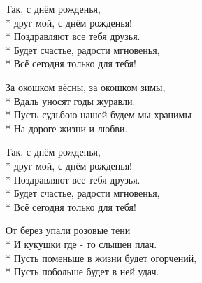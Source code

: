 \medskip

\begin{minipage}{\linewidth}
\hspace*{1.5em}Так, с днём рожденья,\\*
\hspace*{1.5em}друг мой, с днём рожденья!\\*
\hspace*{1.5em}Поздравляют все тебя друзья.\\*
\hspace*{1.5em}Будет счастье, радости мгновенья,\\*
\hspace*{1.5em}Всё сегодня только для тебя!\\
\end{minipage}\par\medskip\nobreak

\medskip

\begin{minipage}{\linewidth}
За окошком вёсны, за окошком зимы,\\*
Вдаль уносят годы журавли.\\*
Пусть судьбою нашей будем мы хранимы\\*
На дороге жизни и любви.\\
\end{minipage}\par\medskip\nobreak

\medskip

\begin{minipage}{\linewidth}
\hspace*{1.5em}Так, с днём рожденья,\\*
\hspace*{1.5em}друг мой, с днём рожденья!\\*
\hspace*{1.5em}Поздравляют все тебя друзья.\\*
\hspace*{1.5em}Будет счастье, радости мгновенья,\\*
\hspace*{1.5em}Всё сегодня только для тебя!\\
\end{minipage}\par\medskip\nobreak

\medskip

\begin{minipage}{\linewidth}
От берез упали розовые тени\\*
И кукушки где - то слышен плач.\\*
Пусть поменьше в жизни будет огорчений,\\*
Пусть побольше будет в ней удач.\\
\end{minipage}\par\medskip\nobreak

